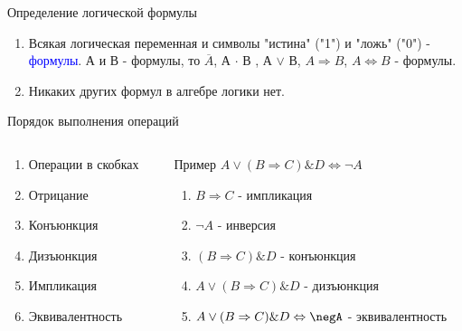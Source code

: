 \documentclass[aspectratio=169]{beamer}
\newcommand{\blu}{\textcolor{blue}}
\newcommand{\n}{\normalsize}
\begin{document}
\begin{frame}{Определение логической формулы}
\begin{enumerate} \Large
    \item Всякая логическая переменная и символы \alert{"истина"} ("1") и \alert{"ложь"} ("0") - \blu{формулы}.
     \alert{А} и \alert{В} - формулы, то \alert{$\overline A$, А $\cdot$ В , А $\vee$ В, $A\Rightarrow B$, $A\Leftrightarrow B$} - формулы.
    \item Никаких других формул в алгебре логики нет. \n
\end{enumerate}
\end{frame}
\begin{frame}{Порядок выполнения операций}
\begin{columns}
    \begin{column}{6cm}
    \begin{enumerate}
        \item Операции в скобках
        \item Отрицание
        \item Конъюнкция
        \item Дизъюнкция
        \item Импликация
        \item Эквивалентность
    \end{enumerate}
    \end{column}
    \begin{column}{8cm}
    \begin{exampleblock}{Пример}
    \alert{$A\vee (B\Rightarrow C)\& D \Leftrightarrow \neg A$}
        \begin{enumerate}
            \item $B\Rightarrow C$ - импликация
            \item $\neg A$ - инверсия
            \item $(B\Rightarrow C)\& D$ - конъюнкция
            \item $A\vee (B\Rightarrow C)\& D$ - дизъюнкция
            \item $A\vee (B\Rightarrow C)\& D\Leftrightarrow\negA$ - эквивалентность
        \end{enumerate}
    \end{exampleblock}
    \end{column}
\end{columns}    
\end{frame}
\end{document}
